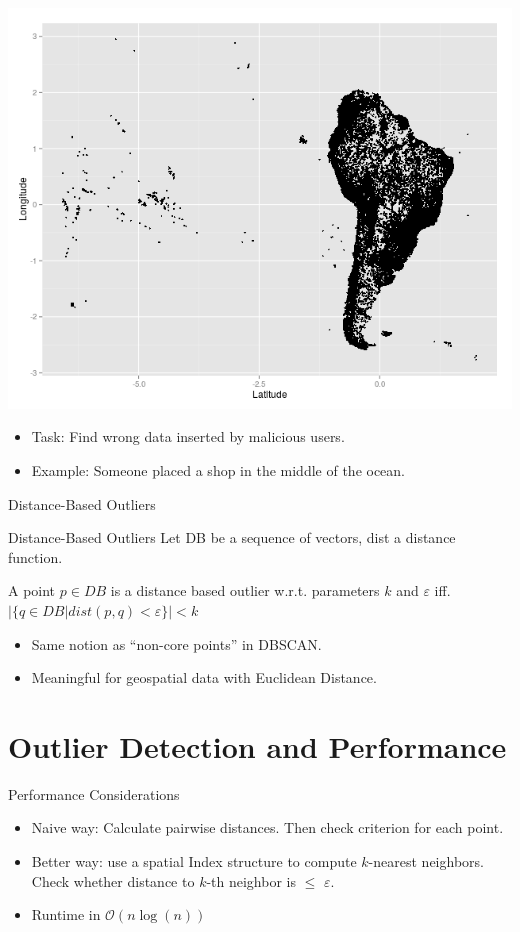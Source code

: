 \documentclass{beamer}
\begin{document}
\begin{frame}
    \begin{center}
    \includegraphics[width=.7\textwidth]{images/south_america.png} 
    \end{center}
    \begin{itemize}
        \item Task: Find wrong data inserted by malicious users.

        \item Example: Someone placed a shop in the middle of the ocean.

    \end{itemize}
\end{frame}

\begin{frame}{Distance-Based Outliers}
    \begin{block}{Distance-Based Outliers}
        Let DB be a sequence of vectors, dist a distance function.

        A point $p\in DB$ is a distance based outlier w.r.t. parameters $k$ and $\varepsilon$
        iff. $|\{q\in DB | dist(p,q) < \varepsilon\}| < k$
    \end{block}

    \begin{itemize}
        \item Same notion as ``non-core points'' in DBSCAN.
        \item Meaningful for geospatial data with Euclidean Distance.
    \end{itemize}
\end{frame}

\section{Outlier Detection and Performance}
\begin{frame}{Performance Considerations}
    \begin{itemize}
        \item Naive way: Calculate pairwise distances. Then check criterion for each point.
        \item Better way: use a spatial Index structure to compute $k$-nearest neighbors. Check whether distance to $k$-th neighbor is $\leq$ $\varepsilon$.
        \item Runtime in $\mathcal{O}(n\log(n))$
    \end{itemize}
\end{frame}
\end{document}
